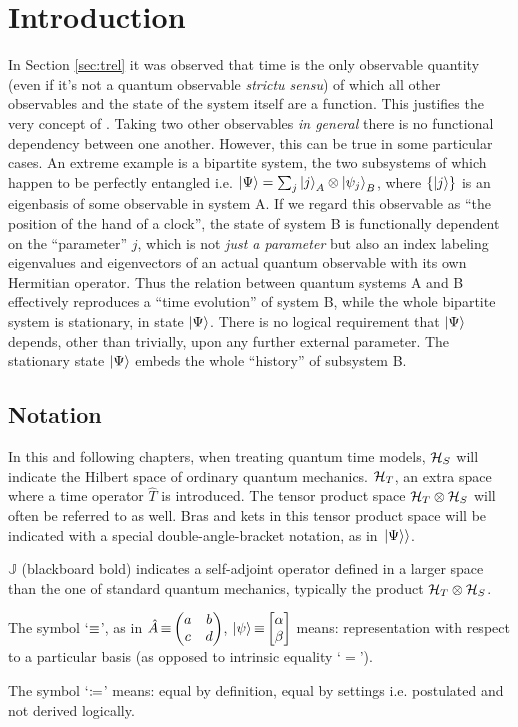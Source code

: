 \section{Introduction}

In Section \ref{sec:trel} it was observed that time is the only observable quantity
(even if it's not a quantum observable \emph{strictu sensu})
of which all other observables and the state of the system itself are a function.
This justifies the very concept of .
Taking two other observables \emph{in general} there is no functional dependency
between one another.
However, this can be true in some particular cases.
An extreme example is a bipartite system,
the two subsystems of which happen to be
perfectly entangled i.e. $ \ket{\Psi} = \sum_{j} \ket{j}_{A} \otimes \ket{\psi_{j}}_{B} $,
where $\qty{\ket{j}}$ is an eigenbasis of some observable in system A.
If we regard this observable as ``the position of the hand of a clock'',
the state of system B is functionally dependent on the ``parameter'' $j$,
which is not \emph{just a parameter} but also an index labeling
eigenvalues and eigenvectors of an actual quantum observable
with its own Hermitian operator.
Thus the relation between quantum systems A and B effectively
reproduces a ``time evolution'' of system B,
while the whole bipartite system
is stationary, in state
$\ket{\Psi}$.
There is no logical requirement that $\ket{\Psi}$
depends, other than trivially,
upon any further external parameter.
The stationary state $\ket{\Psi}$ embeds the whole ``history''
of subsystem B.

\subsection*{Notation}

In this and following chapters, when treating quantum time models,
$\mathcal{H}_S$ will indicate the Hilbert space of ordinary quantum mechanics.
$\mathcal{H}_T$, an extra space where a time operator $\hat{T}$ is introduced. The tensor
product space $\mathcal{H}_T \otimes \mathcal{H}_S$
will often be referred to as well.
Bras and kets in this tensor product space will be indicated with a special double-angle-bracket
notation, as in $\left.\left| \Psi \right\rangle\right\rangle$.

${\mathbb{J}}$ (blackboard bold) indicates a self-adjoint operator defined in
a larger space than the one of standard quantum mechanics,
typically the product $\mathcal{H}_T \otimes \mathcal{H}_S$.

The symbol `$\operatorname*{\equiv}$', as in $\hat{A} \repr \mqty(a&b\\c&d)$, $\ket{\psi} \repr \mqty[\alpha \\ \beta]$
means: representation with respect to a particular basis (as opposed to intrinsic equality `$=$').

The symbol `$\coloneqq$'
means: equal by definition, equal by settings i.e. postulated and not derived logically.
